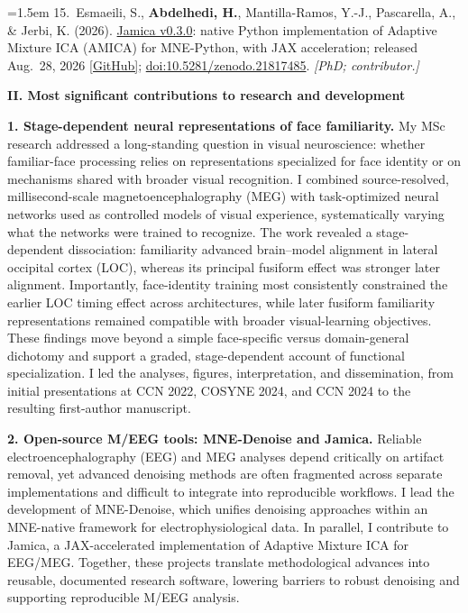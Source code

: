 \documentclass[12pt,letterpaper]{article}
\newcommand{\partheading}[1]{%
  \noindent\textbf{#1}\par\vspace{1pt}%
}
\newcommand{\nsercitem}[2]{%
  \noindent\hangindent=1.5em\hangafter=1 #1 \textit{[#2]}\par%
  \vspace{0pt}%
}
\begin{document}
\nsercitem{15.~Esmaeili, S., \textbf{Abdelhedi, H.}, Mantilla-Ramos, Y.-J.,
  Pascarella, A., \& Jerbi, K. (2026). \href{https://github.com/snesmaeili/jamica}{Jamica
  v0.3.0}: native Python implementation of Adaptive Mixture ICA (AMICA) for MNE-Python,
  with JAX acceleration; released Aug.~28, 2026
  \href{https://github.com/snesmaeili/jamica}{[GitHub]};
  \href{https://doi.org/10.5281/zenodo.21817485}{doi:10.5281/zenodo.21817485}.}{PhD;
  contributor.}

\vspace{2pt}%


\partheading{II. Most significant contributions to research and development}

\textbf{1. Stage-dependent neural representations of face familiarity.}
My MSc research addressed a long-standing question in visual neuroscience: whether
familiar-face processing relies on representations specialized for face identity or on
mechanisms shared with broader visual recognition. I combined source-resolved,
millisecond-scale magnetoencephalography (MEG) with task-optimized neural networks used as controlled models of
visual experience, systematically varying what the networks were trained to recognize.
The work revealed a stage-dependent dissociation: familiarity advanced brain--model
alignment in lateral occipital cortex (LOC), whereas its principal fusiform effect was stronger
later alignment. Importantly, face-identity training most consistently constrained the
earlier LOC timing effect across architectures, while later fusiform familiarity
representations remained compatible with broader visual-learning objectives. These
findings move beyond a simple face-specific versus domain-general dichotomy and support
a graded, stage-dependent account of functional specialization. I led the analyses,
figures, interpretation, and dissemination, from initial presentations at CCN 2022,
COSYNE 2024, and CCN 2024 to the resulting first-author manuscript.

\vspace{0pt}%
\textbf{2. Open-source M/EEG tools: MNE-Denoise and Jamica.}
Reliable electroencephalography (EEG) and MEG analyses depend critically on artifact removal, yet advanced
denoising methods are often fragmented across separate implementations and difficult
to integrate into reproducible workflows. I lead the development of MNE-Denoise,
which unifies denoising approaches within an MNE-native framework for electrophysiological data. In parallel, I contribute
to Jamica, a JAX-accelerated implementation of Adaptive Mixture ICA for EEG/MEG.
Together, these projects translate methodological advances into reusable, documented
research software, lowering barriers to robust denoising and supporting reproducible
M/EEG analysis.
\end{document}
